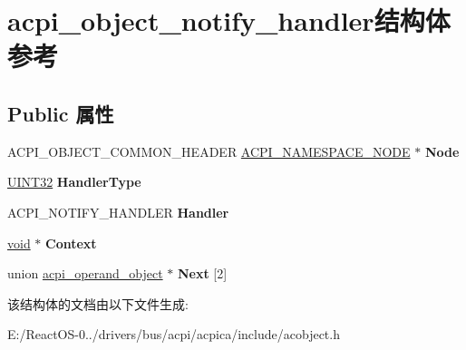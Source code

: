 \hypertarget{structacpi__object__notify__handler}{}\section{acpi\+\_\+object\+\_\+notify\+\_\+handler结构体 参考}
\label{structacpi__object__notify__handler}
\subsection*{Public 属性}
\begin{DoxyCompactItemize}
\item 
\mbox{\label{structacpi__object__notify__handler_a1d2f307c192846d770a039b9f8f83c99}} 
A\+C\+P\+I\+\_\+\+O\+B\+J\+E\+C\+T\+\_\+\+C\+O\+M\+M\+O\+N\+\_\+\+H\+E\+A\+D\+ER \hyperlink{structacpi__namespace__node}{A\+C\+P\+I\+\_\+\+N\+A\+M\+E\+S\+P\+A\+C\+E\+\_\+\+N\+O\+DE} $\ast$ {\bfseries Node}
\item 
\mbox{\label{structacpi__object__notify__handler_a46ac734875243e776c8865f5484ec264}} 
\hyperlink{_processor_bind_8h_ae1e6edbbc26d6fbc71a90190d0266018}{U\+I\+N\+T32} {\bfseries Handler\+Type}
\item 
\mbox{\label{structacpi__object__notify__handler_a9a95b65e950428ef7fb00a7e37f8a8f2}} 
A\+C\+P\+I\+\_\+\+N\+O\+T\+I\+F\+Y\+\_\+\+H\+A\+N\+D\+L\+ER {\bfseries Handler}
\item 
\mbox{\label{structacpi__object__notify__handler_a43674d1e40374262e75ad7b1b1a63953}} 
\hyperlink{interfacevoid}{void} $\ast$ {\bfseries Context}
\item 
\mbox{\label{structacpi__object__notify__handler_ab0bff97964baaf740eae97e8e750bfa3}} 
union \hyperlink{unionacpi__operand__object}{acpi\+\_\+operand\+\_\+object} $\ast$ {\bfseries Next} \mbox{[}2\mbox{]}
\end{DoxyCompactItemize}


该结构体的文档由以下文件生成\+:\begin{DoxyCompactItemize}
\item 
E\+:/\+React\+O\+S-\/0../drivers/bus/acpi/acpica/include/acobject.\+h\end{DoxyCompactItemize}
